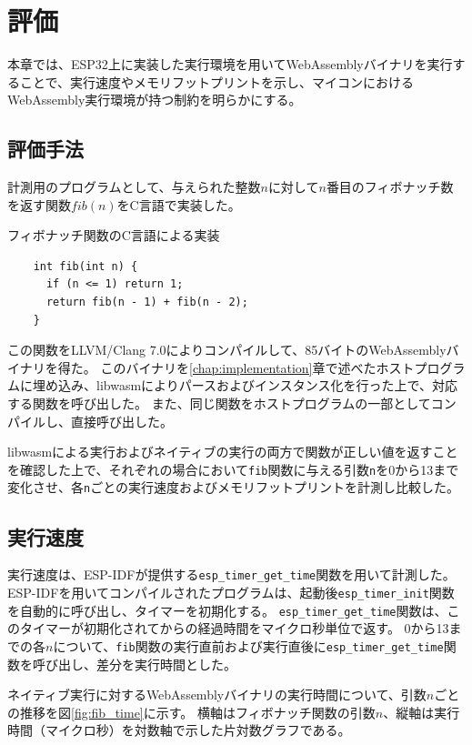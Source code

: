 \chapter{評価}
\label{chap:evaluation}

本章では、ESP32上に実装した実行環境を用いてWebAssemblyバイナリを実行することで、実行速度やメモリフットプリントを示し、マイコンにおけるWebAssembly実行環境が持つ制約を明らかにする。

\section{評価手法}

計測用のプログラムとして、与えられた整数$n$に対して$n$番目のフィボナッチ数を返す関数$fib(n)$をC言語で実装した。

\begin{itembox}[l]{フィボナッチ関数のC言語による実装}
  \begin{verbatim}
    int fib(int n) {
      if (n <= 1) return 1;
      return fib(n - 1) + fib(n - 2);
    }
  \end{verbatim}
\end{itembox}

この関数をLLVM/Clang 7.0によりコンパイルして、85バイトのWebAssemblyバイナリを得た。
このバイナリを\ref{chap:implementation}章で述べたホストプログラムに埋め込み、libwasmによりパースおよびインスタンス化を行った上で、対応する関数を呼び出した。
また、同じ関数をホストプログラムの一部としてコンパイルし、直接呼び出した。

libwasmによる実行およびネイティブの実行の両方で関数が正しい値を返すことを確認した上で、それぞれの場合において\verb|fib|関数に与える引数\verb|n|を0から13まで変化させ、各\verb|n|ごとの実行速度およびメモリフットプリントを計測し比較した。

\section{実行速度}

実行速度は、ESP-IDFが提供する\verb|esp_timer_get_time|関数を用いて計測した。
ESP-IDFを用いてコンパイルされたプログラムは、起動後\verb|esp_timer_init|関数を自動的に呼び出し、タイマーを初期化する。
\verb|esp_timer_get_time|関数は、このタイマーが初期化されてからの経過時間をマイクロ秒単位で返す。
0から13までの各$n$について、\verb|fib|関数の実行直前および実行直後に\verb|esp_timer_get_time|関数を呼び出し、差分を実行時間とした。

ネイティブ実行に対するWebAssemblyバイナリの実行時間について、引数$n$ごとの推移を図\ref{fig:fib_time}に示す。
横軸はフィボナッチ関数の引数$n$、縦軸は実行時間（マイクロ秒）を対数軸で示した片対数グラフである。

